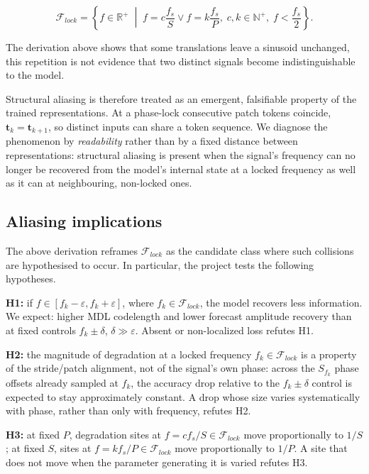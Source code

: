 \begin{equation}
\label{eq:flock_set}
\mathcal F_{lock}
=
\left\{
f\in\mathbb{R}^{+}
\;\middle|\;
f
=
c\frac{f_s}{S}
\lor
f
=
k\frac{f_s}{P},
\;
c, k\in\mathbb{N}^{+},
\;
f<\frac{f_s}{2}
\right\}.
\end{equation}

The derivation above shows that some translations leave a sinusoid unchanged, this repetition is not evidence that two distinct signals become indistinguishable to the model. 

Structural aliasing is therefore treated as an emergent, falsifiable property of the trained representations\cite{paganiPreliminaryInsightsChronos2026}. At a phase-lock consecutive patch tokens coincide, $\mathbf{t}_k=\mathbf{t}_{k+1}$, so distinct inputs can share a token sequence. We diagnose the phenomenon by \emph{readability} rather than by a fixed distance between representations: structural aliasing is present when the signal's frequency can no longer be recovered from the model's internal state at a locked frequency as well as it can at neighbouring, non-locked ones.

\subsection{Aliasing implications}
The above derivation reframes $\mathcal F_{lock}$ as the candidate class where such collisions are hypothesised to occur. In particular, the project tests the following hypotheses.

\textbf{H1:} if $f\in[f_k-\varepsilon,f_k+\varepsilon]$, where $f_k\in\mathcal F_{lock}$, the model recovers less information. We expect: higher MDL codelength and lower forecast amplitude recovery than at fixed controls $f_k\pm\delta$, $\delta\gg\varepsilon$. Absent or non-localized loss refutes H1.

\textbf{H2:} the magnitude of degradation at a locked frequency $f_k\in\mathcal F_{lock}$ is a property of the stride/patch alignment, not of the signal's own phase: across the $S_{f_k}$ phase offsets already sampled at $f_k$, the accuracy drop relative to the $f_k\pm\delta$ control is expected to stay approximately constant. A drop whose size varies systematically with phase, rather than only with frequency, refutes H2.

\textbf{H3:} at fixed $P$, degradation sites at $f=c f_s/S \in \mathcal F_{lock}$ move proportionally to $1/S$; at fixed $S$, sites at $f=k f_s/P \in \mathcal F_{lock}$ move proportionally to $1/P$. A site that does not move when the parameter generating it is varied refutes H3.


